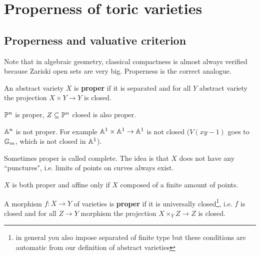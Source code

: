 \section{Properness of toric varieties}

\subsection{Properness and valuative criterion}
Note that in algebraic geometry, classical compactness is almost always verified because Zariski open sets are very big. Properness is the correct analogue.

\begin{definition}[]
An abstract variety $X$ is \textbf{proper} if it is separated and for all $Y$ abstract variety the projection $X\times Y\to Y$ is closed.
\end{definition}


\begin{example}
$\mathbb{P}^n$ is proper, $Z\subseteq \mathbb{P}^n$ closed is also proper.
\end{example}

\begin{example}
$\mathbb{A}^n$ is not proper. For example $\mathbb{A}^1\times \mathbb{A}^1\to \mathbb{A}^1$ is not closed ($V(xy-1)$ goes to $\mathbb{G}_m$, which is not closed in $\mathbb{A}^1$).
\end{example}

\begin{remark}
Sometimes proper is called complete. The idea is that $X$ does not have any ``punctures", i.e. limits of points on curves always exist.
\end{remark}

\begin{remark}
$X$ is both proper and affine only if $X$ composed of a finite amount of points.
\end{remark}

\begin{definition}[]
A morphism $f:X\to Y$ of varieties is \textbf{proper} if it is universally closed\footnote{in general you also impose separated of finite type but these conditions are automatic from our definition of abstract varieties}, i.e. $f$ is closed and for all $Z\to Y$ morphism the projection $X\times_Y Z\to Z$ is closed.
\end{definition}


